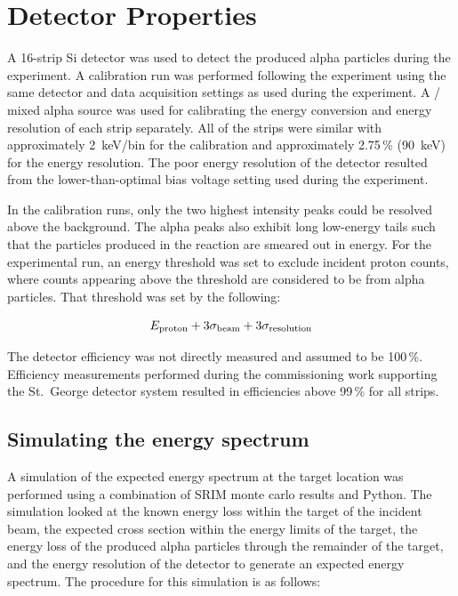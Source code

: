 \section{Detector Properties}
\label{sec:detector-properties}

A 16-strip Si detector was used to detect the produced alpha particles during
the experiment. A calibration run was performed following the experiment using
the same detector and data acquisition settings as used during the experiment.
A / mixed alpha source was used for calibrating the
energy conversion and energy resolution of each strip separately. All of the
strips were similar with approximately 2~keV/bin for the calibration and
approximately 2.75\,\% (90~keV) for the energy resolution. The poor
energy resolution of the detector resulted from the lower-than-optimal
bias voltage setting used during the experiment.

In the calibration runs, only the two highest intensity peaks could be resolved
above the background. The alpha peaks also exhibit long
low-energy tails such that the particles produced in the \alpa{} reaction are
smeared out in energy. For the experimental run, an energy threshold was
set to exclude incident proton counts, where counts appearing above the
threshold are considered to be from alpha particles. That threshold was
set by the following:

\begin{equation}
    E_{\rm proton} + 3 \sigma_{\rm beam} + 3 \sigma_{\rm resolution}
\end{equation}

The detector efficiency was not directly measured and assumed to be
100\,\%. Efficiency measurements performed during the commissioning work
supporting the St.\ George detector system resulted in efficiencies above
99\,\% for all strips.

\subsection{Simulating the energy spectrum}
\label{sec:05-simulating-spectrum}

A simulation of the expected energy spectrum at the target location was
performed using a combination of SRIM monte carlo results and Python. The
simulation looked at the known energy loss within the target of the incident
beam, the expected cross
section within the energy limits of the target, the energy loss of the
produced alpha particles through the remainder of the target, and the
energy resolution of the detector to generate an expected energy
spectrum. The procedure for this simulation is as follows:


